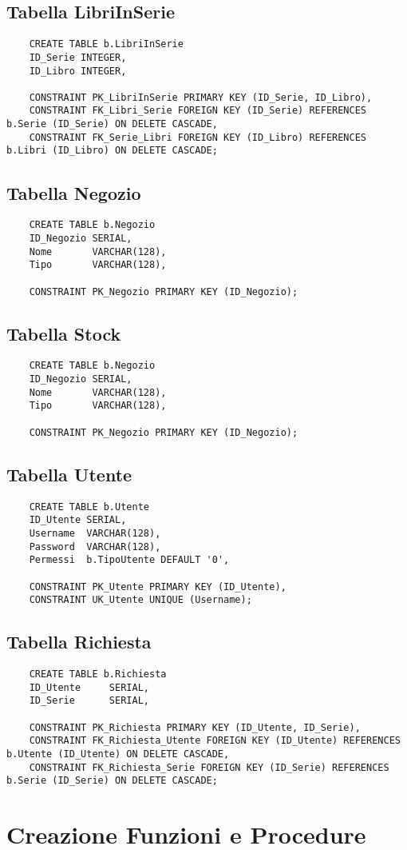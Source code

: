 \newpage

\subsection{Tabella LibriInSerie}
\begin{lstlisting}
    CREATE TABLE b.LibriInSerie
    ID_Serie INTEGER,
    ID_Libro INTEGER,

    CONSTRAINT PK_LibriInSerie PRIMARY KEY (ID_Serie, ID_Libro),
    CONSTRAINT FK_Libri_Serie FOREIGN KEY (ID_Serie) REFERENCES b.Serie (ID_Serie) ON DELETE CASCADE,
    CONSTRAINT FK_Serie_Libri FOREIGN KEY (ID_Libro) REFERENCES b.Libri (ID_Libro) ON DELETE CASCADE;
\end{lstlisting}

\subsection{Tabella Negozio}
\begin{lstlisting}
    CREATE TABLE b.Negozio
    ID_Negozio SERIAL,
    Nome       VARCHAR(128),
    Tipo       VARCHAR(128),

    CONSTRAINT PK_Negozio PRIMARY KEY (ID_Negozio);
\end{lstlisting}

\subsection{Tabella Stock}
\begin{lstlisting}
    CREATE TABLE b.Negozio
    ID_Negozio SERIAL,
    Nome       VARCHAR(128),
    Tipo       VARCHAR(128),

    CONSTRAINT PK_Negozio PRIMARY KEY (ID_Negozio);
\end{lstlisting}

\subsection{Tabella Utente}
\begin{lstlisting}
    CREATE TABLE b.Utente
    ID_Utente SERIAL,
    Username  VARCHAR(128),
    Password  VARCHAR(128),
    Permessi  b.TipoUtente DEFAULT '0',

    CONSTRAINT PK_Utente PRIMARY KEY (ID_Utente),
    CONSTRAINT UK_Utente UNIQUE (Username);
\end{lstlisting}

\newpage

\subsection{Tabella Richiesta}
\begin{lstlisting}
    CREATE TABLE b.Richiesta
    ID_Utente     SERIAL,
    ID_Serie      SERIAL,

    CONSTRAINT PK_Richiesta PRIMARY KEY (ID_Utente, ID_Serie),
    CONSTRAINT FK_Richiesta_Utente FOREIGN KEY (ID_Utente) REFERENCES b.Utente (ID_Utente) ON DELETE CASCADE,
    CONSTRAINT FK_Richiesta_Serie FOREIGN KEY (ID_Serie) REFERENCES b.Serie (ID_Serie) ON DELETE CASCADE;
\end{lstlisting}

\section{Creazione Funzioni e Procedure}